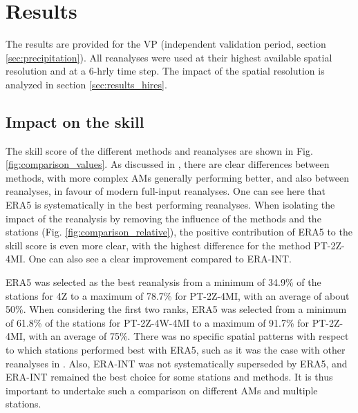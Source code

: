 \documentclass[alpha-refs]{wiley-article}
\begin{document}
\section{Results}
\label{sec:results}

The results are provided for the VP (independent validation period, section \ref{sec:precipitation}). All reanalyses were used at their highest available spatial resolution and at a 6-hrly time step. The impact of the spatial resolution is analyzed in section \ref{sec:results_hires}.

\subsection{Impact on the skill}
\label{sec:results_skill}

The skill score of the different methods and reanalyses are shown in Fig. \ref{fig:comparison_values}. As discussed in \citet{Horton2018b}, there are clear differences between methods, with more complex AMs generally performing better, and also between reanalyses, in favour of modern full-input reanalyses. One can see here that ERA5 is systematically in the best performing reanalyses. When isolating the impact of the reanalysis by removing the influence of the methods and the stations (Fig. \ref{fig:comparison_relative}), the positive contribution of ERA5 to the skill score is even more clear, with the highest difference for the method PT-2Z-4MI. One can also see a clear improvement compared to ERA-INT.

ERA5 was selected as the best reanalysis from a minimum of 34.9\% of the stations for 4Z to a maximum of 78.7\% for PT-2Z-4MI, with an average of about 50\%. When considering the first two ranks, ERA5 was selected from a minimum of 61.8\% of the stations for PT-2Z-4W-4MI to a maximum of 91.7\% for PT-2Z-4MI, with an average of 75\%. There was no specific spatial patterns with respect to which stations performed best with ERA5, such as it was the case with other reanalyses in \citet{Horton2018b}. Also, ERA-INT was not systematically superseded by ERA5, and ERA-INT remained the best choice for some stations and methods. It is thus important to undertake such a comparison on different AMs and multiple stations.
\end{document}
